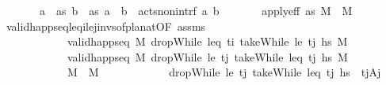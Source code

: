 \begin{isabellebody}
\ \ \ \ \ \ {}{\isacharcolon}{\kern0pt}\ {\isachardoublequoteopen}{\isasymforall}a\ {\isasymin}\ {\isacharquery}{\kern0pt}as{\isachardot}{\kern0pt}\ {\isasymforall}b\ {\isasymin}\ {\isacharquery}{\kern0pt}as{\isachardot}{\kern0pt}\ a\ {\isasymnoteq}\ b\ {\isasymlongrightarrow}\ acts{\isacharunderscore}{\kern0pt}non{\isacharunderscore}{\kern0pt}intrf\ a\ b{\isachardoublequoteclose}\isanewline
\ \ \ \ \ \ {}{\isacharcolon}{\kern0pt}\ {\isachardoublequoteopen}apply{\isacharunderscore}{\kern0pt}eff\ {\isacharquery}{\kern0pt}as\ M\ {\isacharequal}{\kern0pt}\ M{\isacharprime}{\kern0pt}{\isachardoublequoteclose}\isanewline
\ \ \ \ \ \ \isamarkupfalse%
\ valid{\isacharunderscore}{\kern0pt}happ{\isacharunderscore}{\kern0pt}seq{\isacharunderscore}{\kern0pt}leq\isactrlsub i{\isacharunderscore}{\kern0pt}le\isactrlsub j{\isacharunderscore}{\kern0pt}invs{\isacharunderscore}{\kern0pt}of{\isacharunderscore}{\kern0pt}plan{\isacharunderscore}{\kern0pt}at{\isacharbrackleft}{\kern0pt}OF\ assms{\isacharbrackright}{\kern0pt}\isanewline
\ \ \ \ \ \ \ \ \ \ \ \ {\isacartoucheopen}valid{\isacharunderscore}{\kern0pt}happ{\isacharunderscore}{\kern0pt}seq\ M\ {\isacharparenleft}{\kern0pt}dropWhile\ {\isacharparenleft}{\kern0pt}leq\ t\isactrlsub i{\isacharparenright}{\kern0pt}\ {\isacharparenleft}{\kern0pt}takeWhile\ {\isacharparenleft}{\kern0pt}le\ t\isactrlsub j{\isacharparenright}{\kern0pt}\ hs{\isacharparenright}{\kern0pt}{\isacharparenright}{\kern0pt}\ M{\isacharprime}{\kern0pt}{\isacharprime}{\kern0pt}{\isacartoucheclose}\isanewline
\ \ \ \ \ \ \ \ \ \ \ \ {\isacartoucheopen}valid{\isacharunderscore}{\kern0pt}happ{\isacharunderscore}{\kern0pt}seq\ M{\isacharprime}{\kern0pt}{\isacharprime}{\kern0pt}\ {\isacharparenleft}{\kern0pt}dropWhile\ {\isacharparenleft}{\kern0pt}le\ t\isactrlsub j{\isacharparenright}{\kern0pt}\ {\isacharparenleft}{\kern0pt}takeWhile\ {\isacharparenleft}{\kern0pt}leq\ t\isactrlsub j{\isacharparenright}{\kern0pt}\ hs{\isacharparenright}{\kern0pt}{\isacharparenright}{\kern0pt}\ M{\isacharprime}{\kern0pt}{\isacartoucheclose}\ \isanewline
\ \ \ \ \ \ \ \ \ \ \ \ {\isacartoucheopen}M\ {\isacharequal}{\kern0pt}\ M{\isacharprime}{\kern0pt}{\isacharprime}{\kern0pt}{\isacartoucheclose}\isanewline
\ \ \ \ \ \ \ \ \ \ \ \ {\isacartoucheopen}dropWhile\ {\isacharparenleft}{\kern0pt}le\ t\isactrlsub j{\isacharparenright}{\kern0pt}\ {\isacharparenleft}{\kern0pt}takeWhile\ {\isacharparenleft}{\kern0pt}leq\ t\isactrlsub j{\isacharparenright}{\kern0pt}\ hs{\isacharparenright}{\kern0pt}\ {\isacharequal}{\kern0pt}\ {\isacharbrackleft}{\kern0pt}{\isacharparenleft}{\kern0pt}t\isactrlsub j{\isacharcomma}{\kern0pt}A\isactrlsub j{\isacharparenright}{\kern0pt}{\isacharbrackright}{\kern0pt}{\isacartoucheclose}\ \isanewline

\end{isabellebody}
